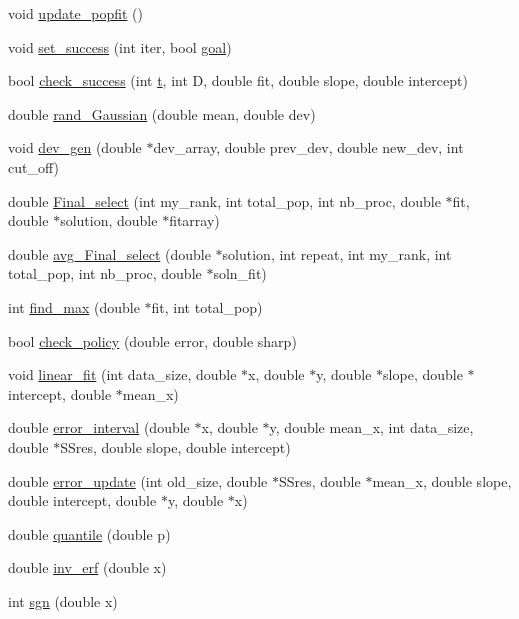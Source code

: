\begin{DoxyCompactItemize}
void \hyperlink{class_opt_alg_a7db6fbc363c4d98858d7c10a60c26e96}{update\+\_\+popfit} ()
\item 
void \hyperlink{class_opt_alg_aede105b27f0777435108e3c8d79b0e91}{set\+\_\+success} (int iter, bool \hyperlink{class_opt_alg_adf188f99e90b0d81c699dd5e8da9d93a}{goal})
\item 
bool \hyperlink{class_opt_alg_a41481c4ce793a16e68a4d5950a9dfe48}{check\+\_\+success} (int \hyperlink{class_opt_alg_a716972bd2e408aa4b77be28fa2f0cbb1}{t}, int D, double fit, double slope, double intercept)
\item 
double \hyperlink{class_opt_alg_ac6082918315a026c3d99c9e01b5820f7}{rand\+\_\+\+Gaussian} (double mean, double dev)
\item 
void \hyperlink{class_opt_alg_a066626a5ae556db202925836792d86af}{dev\+\_\+gen} (double $\ast$dev\+\_\+array, double prev\+\_\+dev, double new\+\_\+dev, int cut\+\_\+off)
\item 
double \hyperlink{class_opt_alg_a6ea07ecb3d0dd5cbc13cd8b773c460c5}{Final\+\_\+select} (int my\+\_\+rank, int total\+\_\+pop, int nb\+\_\+proc, double $\ast$fit, double $\ast$solution, double $\ast$fitarray)
\item 
double \hyperlink{class_opt_alg_a99ec1f986f0b41c6d804d27ba6312b44}{avg\+\_\+\+Final\+\_\+select} (double $\ast$solution, int repeat, int my\+\_\+rank, int total\+\_\+pop, int nb\+\_\+proc, double $\ast$soln\+\_\+fit)
\item 
int \hyperlink{class_opt_alg_aeba3c4b026944928e9353ea49a3f2980}{find\+\_\+max} (double $\ast$fit, int total\+\_\+pop)
\item 
bool \hyperlink{class_opt_alg_ab7f21c9001e6769c4505a6379f15590a}{check\+\_\+policy} (double error, double sharp)
\item 
void \hyperlink{class_opt_alg_a41d6fd881634bf52b87bcaec6d210c44}{linear\+\_\+fit} (int data\+\_\+size, double $\ast$x, double $\ast$y, double $\ast$slope, double $\ast$intercept, double $\ast$mean\+\_\+x)
\item 
double \hyperlink{class_opt_alg_a01eee569fc97269be39dee4d2b79bcb3}{error\+\_\+interval} (double $\ast$x, double $\ast$y, double mean\+\_\+x, int data\+\_\+size, double $\ast$S\+Sres, double slope, double intercept)
\item 
double \hyperlink{class_opt_alg_ab4ba2cac1f5b51fb5fb715b780805825}{error\+\_\+update} (int old\+\_\+size, double $\ast$S\+Sres, double $\ast$mean\+\_\+x, double slope, double intercept, double $\ast$y, double $\ast$x)
\item 
double \hyperlink{class_opt_alg_a36a79062b361107b45689fecc4ad9585}{quantile} (double p)
\item 
double \hyperlink{class_opt_alg_abd15aea33f75b4da44eeea29bb553f82}{inv\+\_\+erf} (double x)
\item 
int \hyperlink{class_opt_alg_a38495fed6c3a7ed75df069109465f405}{sgn} (double x)
\end{DoxyCompactItemize}
